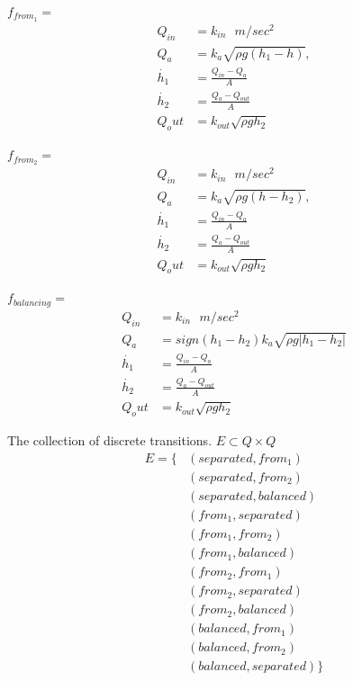 \documentclass{article}
\begin{document}
$f_{from_1} = $
\begin{align}
  Q_{in} &= k_{in} \mbox{ $m/sec^2$ } \\
  Q_a &= k_{a} \sqrt{\rho g (h_1 - h)}, \\
  \dot{h_1} &= \frac{Q_{in} - Q_a}{A} \\
  \dot{h_2} &= \frac{Q_a - Q_{out}}{A} \\
  Q_out &= k_{out} \sqrt{\rho g h_2}
\end{align}

$f_{from_2} = $
\begin{align}
  Q_{in} &= k_{in} \mbox{ $m/sec^2$ } \\
  Q_a &= k_{a} \sqrt{\rho g (h - h_2)}, \\
  \dot{h_1} &= \frac{Q_{in} - Q_a}{A} \\
  \dot{h_2} &= \frac{Q_a - Q_{out}}{A} \\
  Q_out &= k_{out} \sqrt{\rho g h_2}
\end{align}

$f_{balancing} = $
\begin{align}
  Q_{in} &= k_{in} \mbox{ $m/sec^2$ } \\
  Q_a &= sign(h_1 - h_2) k_a \sqrt{\rho g |h_1 - h_2|} \\
  \dot{h_1} &= \frac{Q_{in} - Q_a}{A} \\
  \dot{h_2} &= \frac{Q_a - Q_{out}}{A} \\
  Q_out &= k_{out} \sqrt{\rho g h_2}
\end{align}

The collection of discrete transitions.
$E \subset Q \times Q$
\begin{align}
E = \{
  & ( separated, from_1 ) \\
  & ( separated, from_2 ) \\
  & ( separated, balanced ) \\
  & ( from_1, separated ) \\
  & ( from_1, from_2 ) \\
  & ( from_1, balanced ) \\
  & ( from_2, from_1 ) \\
  & ( from_2, separated ) \\
  & ( from_2, balanced ) \\
  & ( balanced, from_1 ) \\
  & ( balanced, from_2 ) \\
  & ( balanced, separated )  \}
\end{align}
\end{document}
